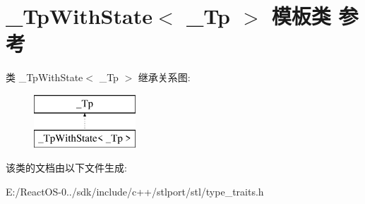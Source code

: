 \hypertarget{class___tp_with_state}{}\section{\+\_\+\+Tp\+With\+State$<$ \+\_\+\+Tp $>$ 模板类 参考}
\label{class___tp_with_state}
类 \+\_\+\+Tp\+With\+State$<$ \+\_\+\+Tp $>$ 继承关系图\+:\begin{figure}[H]
\begin{center}
\leavevmode
\includegraphics[height=2.000000cm]{class___tp_with_state}
\end{center}
\end{figure}


该类的文档由以下文件生成\+:\begin{DoxyCompactItemize}
\item 
E\+:/\+React\+O\+S-\/0../sdk/include/c++/stlport/stl/type\+\_\+traits.\+h\end{DoxyCompactItemize}
